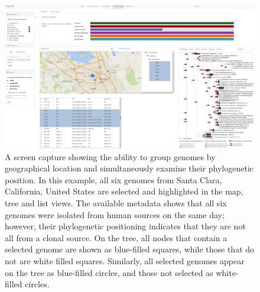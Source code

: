 \documentclass[doublespacing, linenumbers]{bmcart}
\begin{document}
\begin{backmatter}
\begin{landscape}
\newpage
\begin{figure}[h!]
  \includegraphics[width=1\columnwidth]{images/map_tree_california.png}
  \caption{A screen capture showing the ability to group genomes by geographical location and simultaneously examine their phylogenetic position. In this example, all six genomes from Santa Clara, California, United States are selected and highlighted in the map, tree and list views. The available metadata shows that all six genomes were isolated from human sources on the same day; however, their phylogenetic positioning indicates that they are not all from a clonal source.  On the tree, all nodes that contain a selected genome are shown as blue-filled squares, while those that do not are white filled squares. Similarly, all selected genomes appear on the tree as blue-filled circles, and those not selected as white-filled circles.}
  \label{fig:santa_clara}
\end{figure}
\end{landscape}



\newpage

\end{backmatter}
\end{document}
